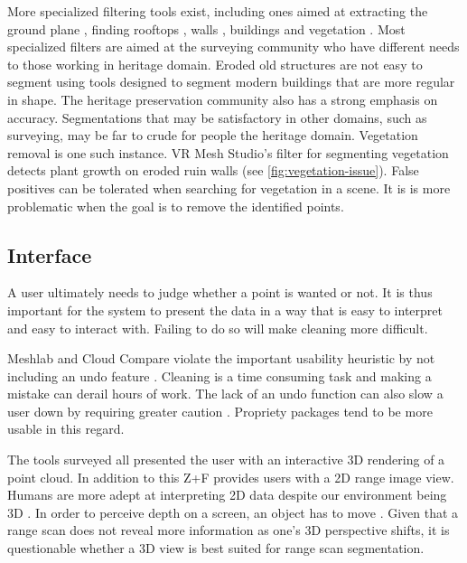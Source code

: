 More specialized filtering tools exist, including ones aimed at extracting the ground plane \cite{Terrasolid2012, VirtualGrid2012}, finding rooftops \cite{VirtualGrid2012}, walls \cite{VirtualGrid2012}, buildings \cite{Terrasolid2012} and vegetation \cite{Terrasolid2012}. Most specialized filters are aimed at the surveying community who have different needs to those working in heritage domain. Eroded old structures are not easy to segment using tools designed to segment modern buildings that are more regular in shape. The heritage preservation community also has a strong emphasis on accuracy. Segmentations that may be satisfactory in other domains, such as surveying, may be far to crude for people  the heritage domain. Vegetation removal is one such instance. VR Mesh Studio's \cite{VirtualGrid2012} filter for segmenting vegetation detects plant growth on eroded ruin walls (see \autoref{fig:vegetation-issue}). False positives can be tolerated when searching for vegetation in a scene. It is is more problematic when the goal is to remove the identified points.

\subsection{Interface}
A user ultimately needs to judge whether a point is wanted or not. It is thus important for the system to present the data in a way that is easy to interpret and easy to interact with. Failing to do so will make cleaning more difficult.

Meshlab and Cloud Compare violate the important usability heuristic by not including an undo feature \cite{Nielsen2005}. Cleaning is a time consuming task and making a mistake can derail hours of work. The lack of an undo function can also slow a user down by requiring greater caution \cite{Miller1977}. Propriety packages tend to be more usable in this regard.


The tools surveyed all presented the user with an interactive 3D rendering of a point cloud. In addition to this Z+F \cite{Z+F2014} provides users with a 2D range image view. Humans are more adept at interpreting 2D data despite our environment being 3D \cite{Livingstone1987}. In order to perceive depth on a screen, an object has to move . Given that a range scan does not reveal more information as one's 3D perspective shifts, it is questionable whether a 3D view is best suited for range scan segmentation. \\

